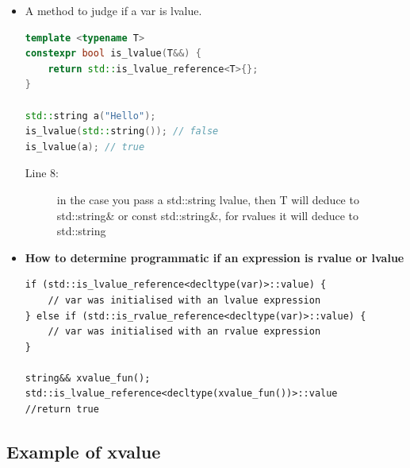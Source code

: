 \documentclass[a4paper,11pt,twoside]{book}
\begin{document}
\begin{itemize}
\item A method to judge if a var is lvalue.
\begin{lstlisting}[frame=single, language=c++]
template <typename T>
constexpr bool is_lvalue(T&&) {
	return std::is_lvalue_reference<T>{};
}

std::string a("Hello");
is_lvalue(std::string()); // false
is_lvalue(a); // true  
\end{lstlisting}

\begin{description}
	\item[Line 8:] in the case you pass a std::string lvalue, then T will deduce to std::string\& or const std::string\&, for rvalues it will deduce to std::string
\end{description}

\item \textbf{How to determine programmatic if an expression is rvalue or lvalue}
\begin{lstlisting}[numbers=none]
if (std::is_lvalue_reference<decltype(var)>::value) {
	// var was initialised with an lvalue expression
} else if (std::is_rvalue_reference<decltype(var)>::value) {
	// var was initialised with an rvalue expression
}

string&& xvalue_fun();
std::is_lvalue_reference<decltype(xvalue_fun())>::value
//return true
\end{lstlisting}

\end{itemize}

\subsection{Example of xvalue}
\end{document}
